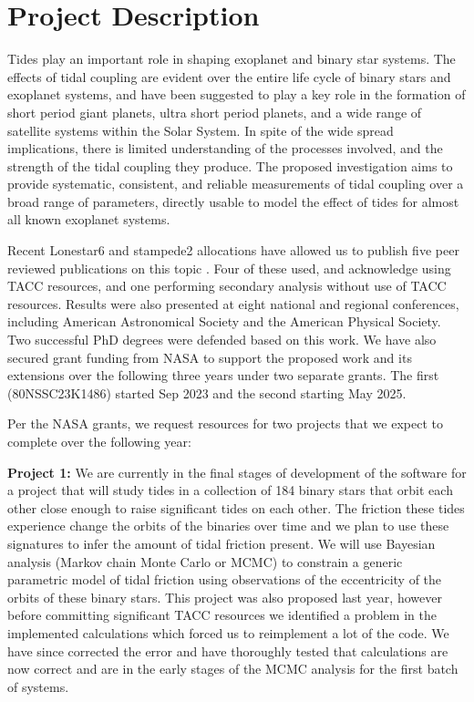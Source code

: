 \documentclass[12pt]{article}
\begin{document}
\maketitle

\vspace{-15mm}

\section{Project Description}

Tides play an important role in shaping exoplanet and binary star systems. The
effects of tidal coupling are evident over the entire life cycle of binary stars
and exoplanet systems, and have been suggested to play a key role in the
formation of short period giant planets, ultra short period planets, and a wide
range of satellite systems within the Solar System. In spite of the wide spread
implications, there is limited understanding of the processes involved, and the
strength of the tidal coupling they produce. The proposed investigation aims to
provide systematic, consistent, and reliable measurements of tidal coupling over
a broad range of parameters, directly usable to model the effect of tides for
almost all known exoplanet systems.

Recent Lonestar6 and stampede2 allocations have allowed us to publish five peer
reviewed publications on this topic \citep{Mahmud_et_al_23, Patel_et_al_23,
Penev_Schussler_22, Anderson_et_al_21, Penev_et_al_18}. Four of these used, and
acknowledge using TACC resources, and one performing secondary analysis without
use of TACC resources. Results were also presented at eight national and
regional conferences, including American Astronomical Society and the American
Physical Society. Two successful PhD degrees were defended based on this work.
We have also secured grant funding from NASA to support the proposed work and
its extensions over the following three years under two separate grants. The
first (80NSSC23K1486) started Sep 2023 and the second starting May 2025.

Per the NASA grants, we request resources for two projects that we expect to
complete over the following year:

\textbf{Project 1:} We are currently in the final stages of development of the
software for a project that will study tides in a collection of 184 binary stars
that orbit each other close enough to raise significant tides on each other. The
friction these tides experience change the orbits of the binaries over time and
we plan to use these signatures to infer the amount of tidal friction present.
We will use Bayesian analysis (Markov chain Monte Carlo or MCMC) to constrain a
generic parametric model of tidal friction using observations of the
eccentricity of the orbits of these binary stars. This project was also proposed
last year, however before committing significant TACC resources we identified a
problem in the implemented calculations which forced us to reimplement a lot of
the code. We have since corrected the error and have thoroughly tested that
calculations are now correct and are in the early stages of the MCMC analysis
for the first batch of systems.
\end{document}
